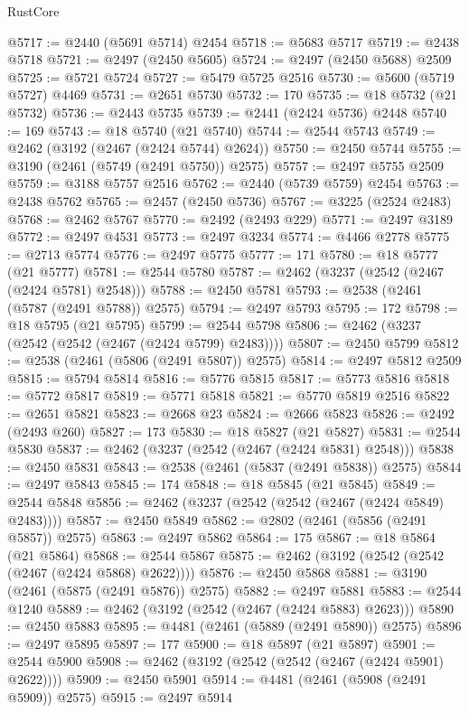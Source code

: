 \begin{lexlean}{RustCore}
\begin{coremodule}
@5717 := @2440 (@5691 @5714) @2454
@5718 := @5683 @5717
@5719 := @2438 @5718
@5721 := @2497 (@2450 @5605)
@5724 := @2497 (@2450 @5688) @2509
@5725 := @5721 @5724
@5727 := @5479 @5725 @2516
@5730 := @5600 (@5719 @5727) @4469
@5731 := @2651 @5730
@5732 := 170
@5735 := @18 @5732 (@21 @5732)
@5736 := @2443 @5735
@5739 := @2441 (@2424 @5736) @2448
@5740 := 169
@5743 := @18 @5740 (@21 @5740)
@5744 := @2544 @5743
@5749 := @2462 (@3192 (@2467 (@2424 @5744) @2624))
@5750 := @2450 @5744
@5755 := @3190 (@2461 (@5749 (@2491 @5750)) @2575)
@5757 := @2497 @5755 @2509
@5759 := @3188 @5757 @2516
@5762 := @2440 (@5739 @5759) @2454
@5763 := @2438 @5762
@5765 := @2457 (@2450 @5736)
@5767 := @3225 (@2524 @2483)
@5768 := @2462 @5767
@5770 := @2492 (@2493 @229)
@5771 := @2497 @3189
@5772 := @2497 @4531
@5773 := @2497 @3234
@5774 := @4466 @2778
@5775 := @2713 @5774
@5776 := @2497 @5775
@5777 := 171
@5780 := @18 @5777 (@21 @5777)
@5781 := @2544 @5780
@5787 := @2462 (@3237 (@2542 (@2467 (@2424 @5781) @2548)))
@5788 := @2450 @5781
@5793 := @2538 (@2461 (@5787 (@2491 @5788)) @2575)
@5794 := @2497 @5793
@5795 := 172
@5798 := @18 @5795 (@21 @5795)
@5799 := @2544 @5798
@5806 := @2462 (@3237 (@2542 (@2542 (@2467 (@2424 @5799) @2483))))
@5807 := @2450 @5799
@5812 := @2538 (@2461 (@5806 (@2491 @5807)) @2575)
@5814 := @2497 @5812 @2509
@5815 := @5794 @5814
@5816 := @5776 @5815
@5817 := @5773 @5816
@5818 := @5772 @5817
@5819 := @5771 @5818
@5821 := @5770 @5819 @2516
@5822 := @2651 @5821
@5823 := @2668 @23
@5824 := @2666 @5823
@5826 := @2492 (@2493 @260)
@5827 := 173
@5830 := @18 @5827 (@21 @5827)
@5831 := @2544 @5830
@5837 := @2462 (@3237 (@2542 (@2467 (@2424 @5831) @2548)))
@5838 := @2450 @5831
@5843 := @2538 (@2461 (@5837 (@2491 @5838)) @2575)
@5844 := @2497 @5843
@5845 := 174
@5848 := @18 @5845 (@21 @5845)
@5849 := @2544 @5848
@5856 := @2462 (@3237 (@2542 (@2542 (@2467 (@2424 @5849) @2483))))
@5857 := @2450 @5849
@5862 := @2802 (@2461 (@5856 (@2491 @5857)) @2575)
@5863 := @2497 @5862
@5864 := 175
@5867 := @18 @5864 (@21 @5864)
@5868 := @2544 @5867
@5875 := @2462 (@3192 (@2542 (@2542 (@2467 (@2424 @5868) @2622))))
@5876 := @2450 @5868
@5881 := @3190 (@2461 (@5875 (@2491 @5876)) @2575)
@5882 := @2497 @5881
@5883 := @2544 @1240
@5889 := @2462 (@3192 (@2542 (@2467 (@2424 @5883) @2623)))
@5890 := @2450 @5883
@5895 := @4481 (@2461 (@5889 (@2491 @5890)) @2575)
@5896 := @2497 @5895
@5897 := 177
@5900 := @18 @5897 (@21 @5897)
@5901 := @2544 @5900
@5908 := @2462 (@3192 (@2542 (@2542 (@2467 (@2424 @5901) @2622))))
@5909 := @2450 @5901
@5914 := @4481 (@2461 (@5908 (@2491 @5909)) @2575)
@5915 := @2497 @5914

\end{coremodule}
\end{lexlean}
